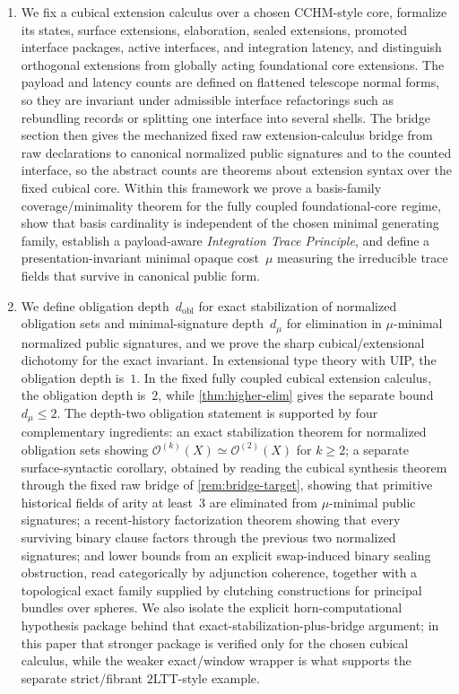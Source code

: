 \documentclass{lmcs}
\newcommand{\Ocal}{\mathcal{O}}
\begin{document}
\begin{enumerate}
\item We fix a cubical extension calculus over a chosen CCHM-style core, formalize its states, surface extensions, elaboration, sealed extensions, promoted interface packages, active interfaces, and integration latency, and distinguish orthogonal extensions from globally acting foundational core extensions. The payload and latency counts are defined on flattened telescope normal forms, so they are invariant under admissible interface refactorings such as rebundling records or splitting one interface into several shells. The bridge section then gives the mechanized fixed raw extension-calculus bridge from raw declarations to canonical normalized public signatures and to the counted interface, so the abstract counts are theorems about extension syntax over the fixed cubical core. Within this framework we prove a basis-family coverage/minimality theorem for the fully coupled foundational-core regime, show that basis cardinality is independent of the chosen minimal generating family, establish a payload-aware \emph{Integration Trace Principle}, and define a presentation-invariant minimal opaque cost~$\mu$ measuring the irreducible trace fields that survive in canonical public form.
    \item We define obligation depth~$d_{\mathrm{obl}}$ for exact stabilization of normalized obligation sets and minimal-signature depth~$d_\mu$ for elimination in $\mu$-minimal normalized public signatures, and we prove the sharp cubical/extensional dichotomy for the exact invariant. In extensional type theory with UIP, the obligation depth is~$1$. In the fixed fully coupled cubical extension calculus, the obligation depth is~$2$, while \autoref{thm:higher-elim} gives the separate bound $d_\mu \leq 2$. The depth-two obligation statement is supported by four complementary ingredients: an exact stabilization theorem for normalized obligation sets showing $\Ocal^{(k)}(X)\simeq\Ocal^{(2)}(X)$ for $k\geq 2$; a separate surface-syntactic corollary, obtained by reading the cubical synthesis theorem through the fixed raw bridge of \autoref{rem:bridge-target}, showing that primitive historical fields of arity at least~$3$ are eliminated from $\mu$-minimal public signatures; a recent-history factorization theorem showing that every surviving binary clause factors through the previous two normalized signatures; and lower bounds from an explicit swap-induced binary sealing obstruction, read categorically by adjunction coherence, together with a topological exact family supplied by clutching constructions for principal bundles over spheres. We also isolate the explicit horn-computational hypothesis package behind that exact-stabilization-plus-bridge argument; in this paper that stronger package is verified only for the chosen cubical calculus, while the weaker exact/window wrapper is what supports the separate strict/fibrant $2$LTT-style example.

\end{enumerate}
\end{document}
